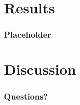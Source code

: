 \documentclass{beamer}
\begin{document}
    \section{Results}

        \begin{frame}
            \frametitle{Placeholder}

        \end{frame}

    \section{Discussion}

        \begin{frame}
            \frametitle{Questions?}

        \end{frame}
\end{document}
